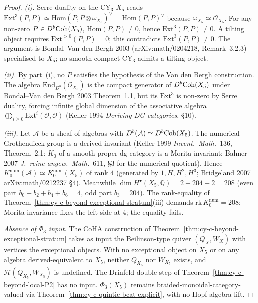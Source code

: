 \begin{proof}
\emph{(i).} Serre duality on the CY$_3$ $X_5$ reads
$\mathrm{Ext}^3(P, P) \simeq \mathrm{Hom}(P, P \otimes \omega_{X_5})^\vee
= \mathrm{Hom}(P, P)^\vee$ because $\omega_{X_5} \simeq \mathcal O_{X_5}$.
For any non-zero $P \in D^b\mathrm{Coh}(X_5)$, $\mathrm{Hom}(P, P) \neq 0$,
hence $\mathrm{Ext}^3(P, P) \neq 0$. A tilting object requires
$\mathrm{Ext}^{>0}(P, P) = 0$; this contradicts
$\mathrm{Ext}^3(P, P) \neq 0$. The argument is
Bondal--Van den Bergh 2003 (arXiv:math/0204218, Remark~3.2.3)
specialised to $X_5$; no smooth compact CY$_3$ admits a tilting object.

\emph{(ii).} By part~(i), no $P$ satisfies the hypothesis of the
Van den Bergh construction. The algebra
$\mathrm{End}_{D^b}(\mathcal O_{X_5})$ is the compact generator of
$D^b\mathrm{Coh}(X_5)$ under Bondal--Van den Bergh 2003 Theorem~1.1, but its
$\mathrm{Ext}^3$ is non-zero by Serre duality, forcing infinite global
dimension of the associative algebra
$\bigoplus_{i \geq 0} \mathrm{Ext}^i(\mathcal O, \mathcal O)$ (Keller 1994
\emph{Deriving DG categories}, \S 10).

\emph{(iii).} Let $\mathcal A$ be a sheaf of algebras with
$D^b(\mathcal A) \simeq D^b\mathrm{Coh}(X_5)$. The numerical Grothendieck group
is a derived invariant (Keller 1999 \emph{Invent.\ Math.}\ 136,
Theorem~2.1: $K_0$ of a smooth proper dg category is a Morita
invariant; Balmer 2007 \emph{J.\ reine angew.\ Math.}\ 611, \S 3 for
the numerical quotient). Hence
$K_0^{\mathrm{num}}(\mathcal A) \simeq K_0^{\mathrm{num}}(X_5)$ of
rank $4$ (generated by $1, H, H^2, H^3$; Bridgeland 2007
arXiv:math/0212237 \S 4). Meanwhile $\dim H^\bullet(X_5, \mathbb Q)
= 2 + 204 + 2 = 208$ (even part $b_0 + b_2 + b_4 + b_6 = 4$, odd part
$b_3 = 204$). The rank-equality of
Theorem~\ref{thm:cy-c-beyond-exceptional-stratum}(iii) demands
$\mathrm{rk}\, K_0^{\mathrm{num}} = 208$; Morita invariance fixes the
left side at $4$; the equality fails.

\emph{Absence of $\Phi_3$ input.} The CoHA construction of
Theorem~\ref{thm:cy-c-beyond-exceptional-stratum} takes as input the
Beilinson-type quiver $(Q_X, W_X)$ with vertices the exceptional
objects. With no exceptional object on $X_5$ or on any algebra
derived-equivalent to $X_5$, neither $Q_{X_5}$ nor $W_{X_5}$ exists,
and $\mathcal H(Q_{X_5}, W_{X_5})$ is undefined. The Drinfeld-double
step of Theorem~\ref{thm:cy-c-beyond-local-P2} has no input.
$\Phi_3(X_5)$ remains braided-monoidal-category-valued via
Theorem~\ref{thm:cy-c-quintic-bcat-explicit}, with no Hopf-algebra lift.
\end{proof}

